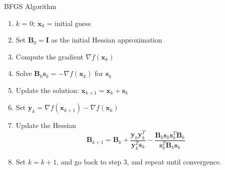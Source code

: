 \documentclass[xcolor=dvipsnames,11pt]{beamer}
\begin{document}
\begin{frame}{BFGS Algorithm}
	\begin{enumerate}
		\item $k$ = 0; $\mathbf{x}_0$ = initial guess
		\item Set $\mathbf{B}_0 = \mathbf{I}$ as the initial Hessian approximation
		\item Compute the gradient $\nabla f(\mathbf{x}_k)$
		\item Solve $\mathbf{B}_k \mathbf{s}_k = -\nabla f(\mathbf{x}_k)$ for $\mathbf{s}_k$
		\item Update the solution: $\mathbf{x}_{k+1} = \mathbf{x}_k + \mathbf{s}_k$
		\item Set $\mathbf{y}_k = \nabla f(\mathbf{x}_{k+1}) - \nabla f(\mathbf{x}_k)$
		\item Update the Hessian
		$$\mathbf{B}_{k+1} = \mathbf{B}_k + \frac{\mathbf{y}_k \mathbf{y}_k^T}{\mathbf{y}_k^T \mathbf{s}_k} - \frac{\mathbf{B}_k \mathbf{s}_k  \mathbf{s}_k^T  \mathbf{B}_k}{ \mathbf{s}_k^T  \mathbf{B}_k \mathbf{s}_k} $$
		\item Set $k = k + 1$, and go back to step 3, and repeat until convergence.
	\end{enumerate}
\end{frame}
		
\end{document}
